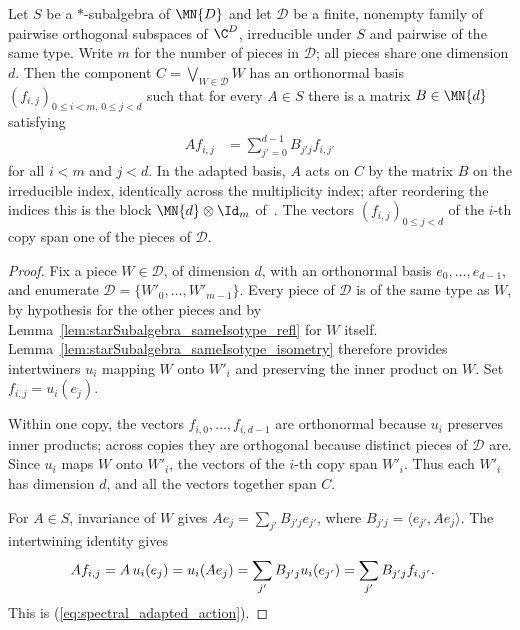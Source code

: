 \begin{theorem}%
    \label{thm:starSubalgebra_adapted_orthonormal_basis}
    \leanok
    Let $S$ be a $*$-subalgebra of $\MN{D}$ and let $\mathcal{D}$ be a finite, nonempty family of pairwise orthogonal subspaces of $\C^D$,
    irreducible under $S$ and pairwise of the same type. Write $m$ for the number of pieces in $\mathcal{D}$; all pieces share one dimension $d$.
    Then the component $C=\bigvee_{W\in\mathcal{D}}W$ has an orthonormal basis $(f_{i,j})_{0\leq i<m,\,0\leq j<d}$ such that for every $A\in S$
    there is a matrix $B\in\MN{d}$ satisfying
    \begin{align}
        A f_{i,j}
        &=\sum_{j'=0}^{d-1}B_{j'j}f_{i,j'}
        \label{eq:spectral_adapted_action}
    \end{align}
    for all $i<m$ and $j<d$. In the adapted basis, $A$ acts on $C$ by the matrix $B$ on the irreducible index, identically across the multiplicity
    index; after reordering the indices this is the block $\MN{d}\otimes\Id_m$ of~\cite[Theorem~6.14]{Wolf2012Quantum}. The
    vectors $(f_{i,j})_{0\leq j<d}$ of the $i$-th copy span one of the pieces of $\mathcal{D}$.
\end{theorem}

\begin{proof}
    \leanok
    Fix a piece $W\in\mathcal{D}$, of dimension $d$, with an orthonormal basis $e_0,\ldots,e_{d-1}$, and enumerate
    $\mathcal{D}=\{W'_0,\ldots,W'_{m-1}\}$. Every piece of $\mathcal{D}$ is of the same type as $W$, by hypothesis for the other pieces and by
    Lemma~\ref{lem:starSubalgebra_sameIsotype_refl} for $W$ itself. Lemma~\ref{lem:starSubalgebra_sameIsotype_isometry} therefore provides
    intertwiners $u_i$ mapping $W$ onto $W'_i$ and preserving the inner product on $W$. Set $f_{i,j}=u_i(e_j)$.

    Within one copy, the vectors $f_{i,0},\ldots,f_{i,d-1}$ are orthonormal because $u_i$ preserves inner products; across copies they are
    orthogonal because distinct pieces of $\mathcal{D}$ are. Since $u_i$ maps $W$ onto $W'_i$, the vectors of the $i$-th copy span $W'_i$. Thus
    each $W'_i$ has dimension $d$, and all the vectors together span $C$.

    For $A\in S$, invariance of $W$ gives $Ae_j=\sum_{j'}B_{j'j}e_{j'}$, where
    $B_{j'j}=\langle e_{j'},Ae_j\rangle$. The intertwining identity gives
    \begin{align}
        A f_{i,j}
        &=A\,u_i(e_j)
          =u_i(Ae_j)
          =\sum_{j'}B_{j'j}u_i(e_{j'})
          =\sum_{j'}B_{j'j}f_{i,j'}.
        \notag
    \end{align}
    This is (\ref{eq:spectral_adapted_action}).
\end{proof}

